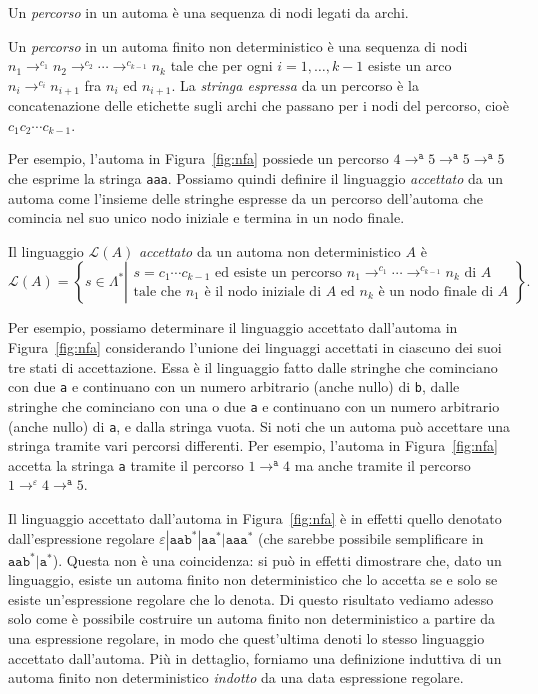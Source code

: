 Un \emph{percorso} in un automa \`e una sequenza di nodi legati da archi.
%
\begin{definition}[Percorso]\label{def:path}
Un \emph{percorso} in un automa finito non deterministico \`e una sequenza
di nodi $n_1\to^{c_1}n_2\to^{c_2}\cdots\to^{c_{k-1}}n_k$
tale che per ogni $i=1,\ldots,k-1$ esiste un arco $n_i\to^{c_i}n_{i+1}$
fra $n_i$ ed $n_{i+1}$. La \emph{stringa espressa} da un
percorso \`e la concatenazione delle etichette sugli archi che passano per i
nodi del percorso, cio\`e $c_1c_2\cdots c_{k-1}$.
\end{definition} 
%
\noindent
Per esempio, l'automa in Figura~\ref{fig:nfa} possiede un percorso
$4\to^\mathtt{a}5\to^\mathtt{a}5\to^\mathtt{a}5$ che esprime la stringa
\texttt{aaa}. Possiamo quindi definire il linguaggio \emph{accettato} da un
automa come l'insieme delle stringhe espresse da un percorso dell'automa
che comincia nel suo unico nodo iniziale e termina in un nodo finale.
%
\begin{definition}\label{def:nfa_accept}
Il linguaggio $\mathcal{L}(A)$ \emph{accettato} da un automa non deterministico
$A$ \`e
\[
  \mathcal{L}(A)=\left\{s\in\Lambda^*\left|\begin{array}{l}
    s=c_1\cdots c_{k-1}\text{ ed esiste un percorso }n_1\to^{c_1}\cdots
      \to^{c_{k-1}}n_k\text{ di $A$}\\
    \text{tale che $n_1$ \`e il nodo iniziale di $A$ ed
          $n_k$ \`e un nodo finale di $A$}
  \end{array}\right.\right\}.
\]
\end{definition}
%
\noindent
Per esempio, possiamo determinare il linguaggio accettato dall'automa in
Figura~\ref{fig:nfa} considerando l'unione dei linguaggi accettati in ciascuno
dei suoi tre stati di accettazione. Essa \`e il linguaggio
fatto dalle stringhe che cominciano con due \texttt{a} e continuano con
un numero arbitrario (anche nullo) di \texttt{b}, dalle stringhe che
cominciano con una o due \texttt{a}
e continuano con un numero arbitrario (anche nullo)
di \texttt{a}, e dalla stringa vuota. Si noti che un automa pu\`o
accettare una stringa tramite vari percorsi differenti. Per esempio,
l'automa in Figura~\ref{fig:nfa} accetta la stringa \texttt{a} tramite
il percorso $1\to^\mathtt{a}4$ ma anche tramite il percorso
$1\to^\varepsilon 4\to^\mathtt{a}5$.

Il linguaggio accettato dall'automa in Figura~\ref{fig:nfa} \`e in effetti
quello denotato dall'espressione regolare $\varepsilon\mathtt{|aab^*
|aa^*|aaa^*}$ (che sarebbe possibile semplificare in $\mathtt{aab^*|a^*}$).
Questa non \`e una coincidenza: si pu\`o in effetti dimostrare
che, dato un linguaggio, esiste un automa finito non deterministico che
lo accetta se e solo se esiste un'espressione regolare che lo denota. Di questo
risultato vediamo adesso solo come \`e possibile costruire un automa finito non
deterministico a partire da una espressione regolare, in modo che quest'ultima
denoti lo stesso linguaggio accettato dall'automa. Pi\`u in dettaglio,
forniamo una definizione induttiva di un automa finito non deterministico
\emph{indotto} da una data espressione regolare.

